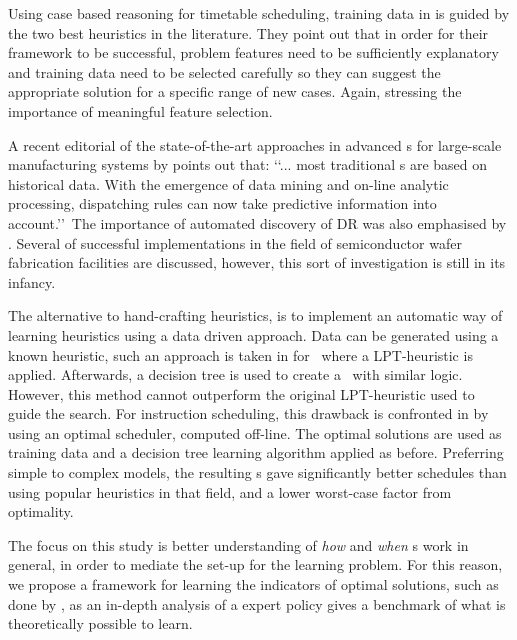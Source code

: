 \documentclass[smallextended]{svjour3}
\begin{document}
\vfill 
{}

Using case based reasoning for timetable scheduling, training data in 
\cite{Burke06} is guided by the two best heuristics in the literature.
They point out that in order for their framework to be successful, problem 
features need to be sufficiently explanatory and training data need to be 
selected carefully so they can suggest the appropriate solution for a specific 
range of new cases. Again, stressing the importance of meaningful feature 
selection. 

\vfill


A recent editorial of the state-of-the-art approaches in advanced \dr s for 
large-scale manufacturing systems by \cite{Chen13} points out that:
\lq\lq ... most traditional \dr s are based on historical data. 
With the emergence of data mining and on-line analytic processing, dispatching 
rules can now take predictive information into account.\rq\rq~The importance of 
automated discovery of DR was also emphasised by \cite{Monch13}. 
Several of successful implementations in the field of semiconductor wafer 
fabrication facilities are discussed, however, this sort of investigation is 
still in its infancy.

The alternative to hand-crafting heuristics, is to implement an automatic way 
of learning heuristics using a data driven approach. 
Data can be generated using a known heuristic, such an approach is taken in 
\cite{Siggi05} for \jsp\, where a LPT-heuristic is applied. Afterwards, a 
decision tree is used to create a \dr\ with similar logic. However, this method 
cannot outperform the original LPT-heuristic used to guide the search. For 
instruction scheduling, this drawback is confronted in 
\cite{Malik08,Russell09,Siggi10} by using an optimal scheduler, computed 
off-line. The optimal solutions are used as training data and a decision tree 
learning algorithm applied as before. Preferring simple to complex models, the 
resulting \dr s gave significantly better schedules than using popular 
heuristics in that field, and a lower worst-case factor from optimality. 

The focus on this study is better understanding of \emph{how} and \emph{when} 
\dr s work in general, in order to mediate the set-up for the 
learning problem.
For this reason, we propose a framework for learning the indicators of optimal 
solutions, such as done by \cite{Siggi10}, as an in-depth analysis of a expert 
policy gives a benchmark of what is theoretically possible to learn. 
\end{document}
